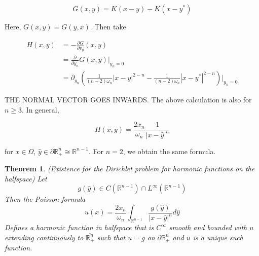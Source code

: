 \documentclass{article}
\newtheorem{theorem}{Theorem}[section]
\newtheorem{one minute paper}[theorem]{One Minute Paper}
\begin{document}
\begin{equation}
    G(x,y) = K(x - y) - K(x - y^*)
\end{equation}

Here, $G(x,y) = G(y,x)$. Then take 

\begin{align*}
    H(x,y) &= -\frac{\partial G}{\partial v_y}(x,y)\\
    &= \frac{\partial}{\partial y_n}G(x,y)\bigg|_{y_n=0} \\
    &= \partial_{y_n}\left( \frac{1}{(n-2)\omega_n}|x-y|^{2-n} - \frac{1}{(n-2)\omega_n}|x-y^*|^{2-n} \right)\bigg|_{y_n = 0}
\end{align*}

THE NORMAL VECTOR GOES INWARDS. The above calculation is also for $n \geq 3$. In general, 

\begin{equation}
    H(x,y) = \frac{2 x_n}{\omega_n}\frac{1}{|x - \hat{y}|^n}
\end{equation}

for $x \in \Omega$, $\hat{y} \in \partial \mathbb{R}^{n}_{+} \cong \mathbb{R}^{n-1}$. For $n=2$, we obtain the same formula. 

\begin{theorem}
    (Existence for the Dirichlet problem for harmonic functions on the halfspace) Let $$g(\hat{y}) \in C(\mathbb{R}^{n-1}) \cap L^{\infty}(\mathbb{R}^{n-1})$$
    Then the Poisson formula 
    \begin{equation}
        u(x) = \frac{2x_n}{\omega_n}\int_{\mathbb{R}^{n-1}}\frac{g(\hat{y})}{|x - \hat{y}|^n}d\hat{y}
    \end{equation}
    Defines a harmonic function in halfspace that is $C^{\infty}$ smooth and bounded with $u$ extending continuously to $\overline{\mathbb{R}_{+}^{n}}$ such that $u = g$ on $\partial \mathbb{R}^{n}_{+}$ and $u$ is a unique such function.  
\end{theorem}
\end{document}
